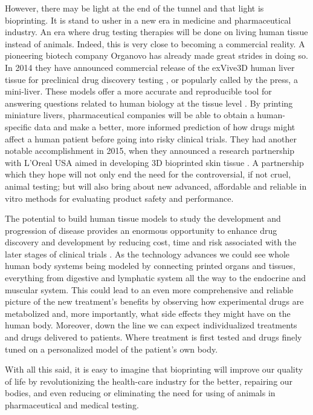 \documentclass[12pt]{article} %
\begin{document}
However, there may be light at the end of the tunnel and that light is bioprinting. It is stand to usher in a new era in medicine and pharmaceutical industry. An era where drug testing therapies will be done on living human tissue instead of animals. Indeed, this is very close to becoming a commercial reality. A pioneering biotech company Organovo has already made great strides in doing so. In 2014 they have announced commercial release of the exVive3D human liver tissue for preclinical drug discovery testing \cite{Organovo:2014}, or popularly called by the press, a mini-liver. These models offer a more accurate and reproducible tool for answering questions related to human biology at the tissue level \cite{Visk:2015}. By printing miniature livers, pharmaceutical companies will be able to obtain a human-specific data and make a better, more informed prediction of how drugs might affect a human patient before going into risky clinical trials. They had another notable accomplishment in 2015, when they announced a research partnership with  L'Oreal USA aimed in developing 3D bioprinted skin tissue \cite{Organovo:2015}. A partnership which they hope will not only end the need for the controversial, if not cruel, animal testing; but will also bring about new advanced, affordable and reliable in vitro methods for evaluating product safety and performance.

The potential to build human tissue models to study the development and progression of disease provides an enormous opportunity to enhance drug discovery and development by reducing cost, time and risk associated with the later stages of clinical trials \cite{Visk:2015}. As the technology advances we could see whole human body systems being modeled by connecting printed organs and tissues, everything from digestive and lymphatic system all the way to the endocrine and muscular system. This could lead to an even more comprehensive and reliable picture of the new treatment's benefits by observing how experimental drugs are metabolized and, more importantly, what side effects they might have on the human body. Moreover, down the line we can expect individualized treatments and drugs delivered to patients. Where treatment is first tested and drugs finely tuned on a personalized model of the patient's own body. 

With all this said, it is easy to imagine that bioprinting will improve our quality of life by revolutionizing the health-care industry for the better, repairing our bodies, and even reducing or eliminating the need for using of animals in pharmaceutical and medical testing.
\end{document}
